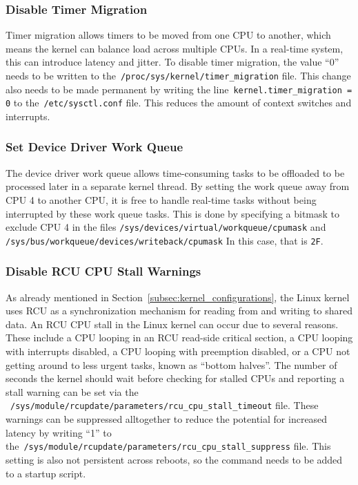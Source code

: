 \documentclass[MMR,Master,english]{twbook}
\begin{document}
\clearpage

\subsubsection{Disable Timer Migration}
Timer migration allows timers to be moved from one CPU to another, which means the kernel can balance load across multiple CPUs. In a real-time system, this can introduce latency and jitter. To disable timer migration, the value ``0'' needs to be written to the~\texttt{/proc/sys/kernel/timer\_migration} file. This change also needs to be made permanent by writing the line~\texttt{kernel.timer\_migration = 0} to the~\texttt{/etc/sysctl.conf} file. This reduces the amount of context switches and interrupts.
\subsubsection{Set Device Driver Work Queue}
The device driver work queue allows time-consuming tasks to be offloaded to be processed later in a separate kernel thread. By setting the work queue away from CPU 4 to another CPU, it is free to handle real-time tasks without being interrupted by these work queue tasks. This is done by specifying a bitmask to exclude CPU 4 in the files \texttt{/sys/devices/virtual/workqueue/cpumask} and \texttt{/sys/bus/workqueue/devices/writeback/cpumask} In this case, that is \texttt{2F}.
\subsubsection{Disable RCU CPU Stall Warnings}
As already mentioned in Section~\ref{subsec:kernel_configurations}, the Linux kernel uses RCU as a synchronization mechanism for reading from and writing to shared data. An RCU CPU stall in the Linux kernel can occur due to several reasons. These include a CPU looping in an RCU read-side critical section, a CPU looping with interrupts disabled, a CPU looping with preemption disabled, or a CPU not getting around to less urgent tasks, known as “bottom halves”. The number of seconds the kernel should wait before checking for stalled CPUs and reporting a stall warning can be set via the ~\texttt{/sys/module/rcupdate/parameters/rcu\_cpu\_stall\_timeout} file. These warnings can be suppressed alltogether to reduce the potential for increased latency by writing ``1'' to the~\texttt{/sys/module/rcupdate/parameters/rcu\_cpu\_stall\_suppress} file. This setting is also not persistent across reboots, so the command needs to be added to a startup script.
\end{document}
